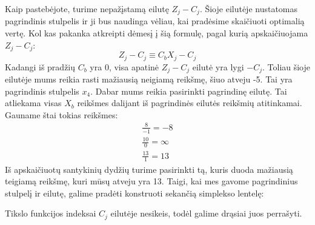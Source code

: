 \documentclass{article}
\begin{document}
Kaip pastebėjote, turime nepažįstamą eilutę $Z_j-C_j$. Šioje eilutėje nustatomas pagrindinis stulpelis ir ji bus naudinga vėliau, kai pradėsime skaičiuoti optimalią vertę. Kol kas pakanka atkreipti dėmesį į šią formulę, pagal kurią apskaičiuojama $Z_j-C_j$:
\begin{equation}
    Z_j-C_j\equiv C_bX_j-C_j
\end{equation}
Kadangi iš pradžių $C_b$ yra 0, visa apatinė $Z_j-C_j$ eilutė yra lygi $-C_j$. Toliau šioje eilutėje mums reikia rasti mažiausią neigiamą reikšmę, šiuo atveju -5. Tai yra pagrindinis stulpelis $x_4$. Dabar mums reikia pasirinkti pagrindinę eilutę. Tai atliekama visas $X_b$ reikšmes dalijant iš pagrindinės eilutės reikšmių atitinkamai. Gauname štai tokias reikšmes:
\begin{equation*}
    \begin{split}
        \frac{8}{-1} = -8\\
        \frac{10}{0} = \infty\\
        \frac{13}{1} = 13
    \end{split}
\end{equation*}
Iš apskaičiuotų santykinių dydžių turime pasirinkti tą, kuris duoda mažiausią teigiamą reikšmę, kuri mūsų atveju yra 13. Taigi, kai mes gavome pagrindinius stulpelį ir eilutę, galime pradėti konstruoti sekančią simplekso lentelę:
\begin{table}[H]
    \centering
\end{table}
Tikslo funkcijos indeksai $C_j$ eilutėje nesikeis, todėl galime drąsiai juos perrašyti.
\end{document}

